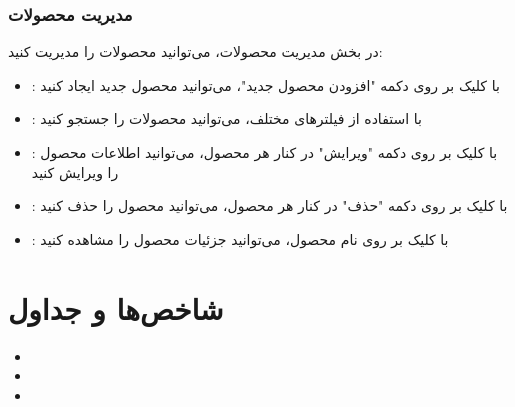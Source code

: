 \documentclass[letterpaper,10pt,english]{sphinxmanual}
\begin{document}
\subsection{مدیریت محصولات}
\label{\detokenize{user_guide/index:id8}}
\sphinxAtStartPar
در بخش مدیریت محصولات، می‌توانید محصولات را مدیریت کنید:
\begin{itemize}
\item {} 
\sphinxAtStartPar
{}: با کلیک بر روی دکمه "افزودن محصول جدید"، می‌توانید محصول جدید ایجاد کنید

\item {} 
\sphinxAtStartPar
{}: با استفاده از فیلترهای مختلف، می‌توانید محصولات را جستجو کنید

\item {} 
\sphinxAtStartPar
{}: با کلیک بر روی دکمه "ویرایش" در کنار هر محصول، می‌توانید اطلاعات محصول را ویرایش کنید

\item {} 
\sphinxAtStartPar
{}: با کلیک بر روی دکمه "حذف" در کنار هر محصول، می‌توانید محصول را حذف کنید

\item {} 
\sphinxAtStartPar
{}: با کلیک بر روی نام محصول، می‌توانید جزئیات محصول را مشاهده کنید

\end{itemize}


\chapter{شاخص‌ها و جداول}
\label{\detokenize{index:id4}}\begin{itemize}
\item {} 
\sphinxAtStartPar
{}

\item {} 
\sphinxAtStartPar
{}

\item {} 
\sphinxAtStartPar
{}

\end{itemize}



\renewcommand{\indexname}{فهرست}
\printindex
\end{document}

